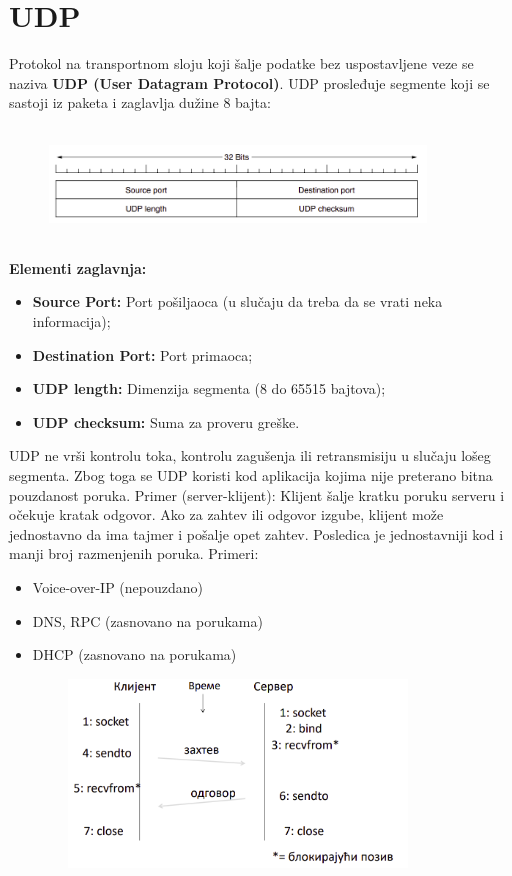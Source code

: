 \documentclass[a4paper]{article}
\begin{document}
\section{UDP}
    Protokol na transportnom sloju koji šalje podatke bez uspostavljene veze se naziva \textbf{UDP
    (User Datagram Protocol)}. UDP prosleđuje segmente koji se sastoji iz paketa i zaglavlja
    dužine 8 bajta:
    \begin{figure}[H]
        \begin{center}
            \includegraphics[width=100mm,height=30mm]{Slike/udp1.png}
        \end{center}
    \end{figure}
    \textbf{Elementi zaglavnja:}
    \begin{itemize}
        \item \textbf{Source Port:} Port pošiljaoca (u slučaju da treba da se vrati neka informacija);
        \item \textbf{Destination Port:} Port primaoca;
        \item \textbf{UDP length:} Dimenzija segmenta (8 do 65515 bajtova);
        \item \textbf{UDP checksum:} Suma za proveru greške.
    \end{itemize}

    UDP ne vrši kontrolu toka, kontrolu zagušenja ili retransmisiju u slučaju lošeg segmenta.
    Zbog toga se UDP koristi kod aplikacija kojima nije preterano bitna pouzdanost poruka.
    Primer (server-klijent): Klijent šalje kratku poruku serveru i očekuje kratak odgovor. Ako
    za zahtev ili odgovor izgube, klijent može jednostavno da ima tajmer i pošalje opet
    zahtev. Posledica je jednostavniji kod i manji broj razmenjenih poruka. Primeri:
    \begin{itemize}
        \item Voice-over-IP (nepouzdano)
        \item DNS, RPC (zasnovano na porukama)
        \item DHCP (zasnovano na porukama)
    \end{itemize}
    \begin{figure}[H]
        \begin{center}
            \includegraphics[width=100mm,height=50mm]{Slike/udp2.png}
        \end{center}
    \end{figure}
    
\end{document}
